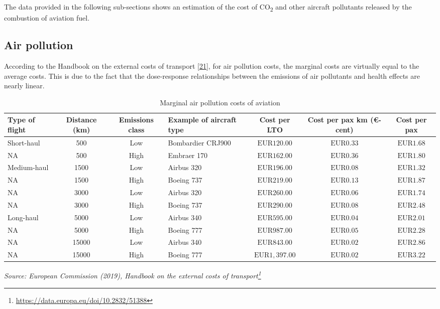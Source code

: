 \documentclass[
  11pt,
  a4paper,
]{book}
\DeclareRobustCommand{\href}[2]{#2\footnote{\url{#1}}}
\begin{document}
The data provided in the following sub-sections shows an estimation of
the cost of CO\textsubscript{2} and other aircraft pollutants released
by the combustion of aviation fuel.

\hypertarget{air-pollution}{%
\subsection{Air pollution}\label{air-pollution}}

According to the Handbook on the external costs of transport
\protect\hyperlink{ref-ecdgmove2019}{{[}21{]}}, for air pollution costs,
the marginal costs are virtually equal to the average costs. This is due
to the fact that the dose-response relationships between the emissions
of air pollutants and health effects are nearly linear.

\hypertarget{tbl-marginal-pollution-cost}{}
\setlength{\LTpost}{0mm}
\begin{longtable}{lcclccc}
\caption{\label{tbl-marginal-pollution-cost}Marginal air pollution costs of aviation }\tabularnewline

\toprule
Type of flight & Distance (km) & Emissions class & Example of aircraft type & Cost per LTO & Cost per pax km (€-cent) & Cost per pax \\ 
\midrule
Short-haul & 500 & Low & Bombardier CRJ900 & $\text{EUR}120.00$ & $\text{EUR}0.33$ & $\text{EUR}1.68$ \\ 
NA & 500 & High & Embraer 170 & $\text{EUR}162.00$ & $\text{EUR}0.36$ & $\text{EUR}1.80$ \\ 
Medium-haul & 1500 & Low & Airbus 320 & $\text{EUR}196.00$ & $\text{EUR}0.08$ & $\text{EUR}1.32$ \\ 
NA & 1500 & High & Boeing 737 & $\text{EUR}219.00$ & $\text{EUR}0.13$ & $\text{EUR}1.87$ \\ 
NA & 3000 & Low & Airbus 320 & $\text{EUR}260.00$ & $\text{EUR}0.06$ & $\text{EUR}1.74$ \\ 
NA & 3000 & High & Boeing 737 & $\text{EUR}290.00$ & $\text{EUR}0.08$ & $\text{EUR}2.48$ \\ 
Long-haul & 5000 & Low & Airbus 340 & $\text{EUR}595.00$ & $\text{EUR}0.04$ & $\text{EUR}2.01$ \\ 
NA & 5000 & High & Boeing 777 & $\text{EUR}987.00$ & $\text{EUR}0.05$ & $\text{EUR}2.28$ \\ 
NA & 15000 & Low & Airbus 340 & $\text{EUR}843.00$ & $\text{EUR}0.02$ & $\text{EUR}2.86$ \\ 
NA & 15000 & High & Boeing 777 & $\text{EUR}1,397.00$ & $\text{EUR}0.02$ & $\text{EUR}3.22$ \\ 
\bottomrule
\end{longtable}
\begin{minipage}{\linewidth}
\emph{Source: \href{https://data.europa.eu/doi/10.2832/51388}{European Commission (2019), Handbook on the external costs of transport}}\\
\end{minipage}
\end{document}
